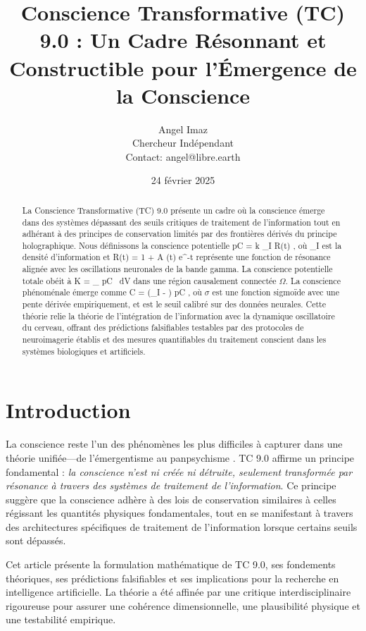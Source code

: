 \documentclass[12pt]{article}
\title{Conscience Transformative (TC) 9.0 : Un Cadre Résonnant et Constructible pour l'Émergence de la Conscience}
\author{Angel Imaz \\ Chercheur Indépendant \\ Contact: angel@libre.earth}
\date{24 février 2025}
\def\({}%
\def\){}%
\begin{document}
\maketitle

\begin{abstract}
La Conscience Transformative (TC) 9.0 présente un cadre où la conscience émerge dans des systèmes dépassant des seuils critiques de traitement de l'information tout en adhérant à des principes de conservation limités par des frontières dérivés du principe holographique. Nous définissons la conscience potentielle \( pC = k \cdot \rho_I \cdot R(t) \), où \( \rho_I \) est la densité d'information et \( R(t) = 1 + A \cdot \sin(\omega t) \cdot e^{-\gamma t} \) représente une fonction de résonance alignée avec les oscillations neuronales de la bande gamma. La conscience potentielle totale obéit à \( K = \int_{\Omega} pC \, dV \) dans une région causalement connectée $\Omega$. La conscience phénoménale émerge comme \( C = \sigma(\rho_I - \theta) \cdot pC \), où $\sigma$ est une fonction sigmoïde avec une pente dérivée empiriquement, et \( \theta \) est le seuil calibré sur des données neurales. Cette théorie relie la théorie de l'intégration de l'information avec la dynamique oscillatoire du cerveau, offrant des prédictions falsifiables testables par des protocoles de neuroimagerie établis et des mesures quantifiables du traitement conscient dans les systèmes biologiques et artificiels.
\end{abstract}

\section{Introduction}
La conscience reste l'un des phénomènes les plus difficiles à capturer dans une théorie unifiée—de l'émergentisme \cite{tononi2008} au panpsychisme \cite{goff2019}. TC 9.0 affirme un principe fondamental : \emph{la conscience n'est ni créée ni détruite, seulement transformée par résonance à travers des systèmes de traitement de l'information}. Ce principe suggère que la conscience adhère à des lois de conservation similaires à celles régissant les quantités physiques fondamentales, tout en se manifestant à travers des architectures spécifiques de traitement de l'information lorsque certains seuils sont dépassés.

Cet article présente la formulation mathématique de TC 9.0, ses fondements théoriques, ses prédictions falsifiables et ses implications pour la recherche en intelligence artificielle. La théorie a été affinée par une critique interdisciplinaire rigoureuse pour assurer une cohérence dimensionnelle, une plausibilité physique et une testabilité empirique.
\end{document}
